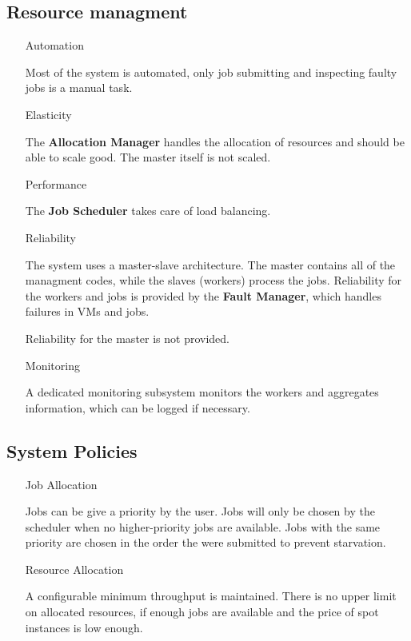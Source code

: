 \documentclass[10pt]{article}
\begin{document}
\subsection*{Resource managment}

\begin{itemize}
\item[Automation]

Most of the system is automated, only job submitting and inspecting faulty jobs is a manual task.

\item[Elasticity]

The \textbf{Allocation Manager} handles the allocation of resources and should be able to scale good. The master itself is not scaled.

\item[Performance]

The \textbf{Job Scheduler} takes care of load balancing.

\item[Reliability]

The system uses a master-slave architecture. The master contains all of the managment codes, while the slaves (workers) process the jobs. Reliability for the workers and jobs is provided by the \textbf{Fault Manager}, which handles failures in VMs and jobs.

Reliability for the master is not provided.

\item[Monitoring]

A dedicated monitoring subsystem monitors the workers and aggregates information, which can be logged if necessary.

\end{itemize}

\subsection*{System Policies}

\begin{itemize}

\item[Job Allocation]

Jobs can be give a priority by the user. Jobs will only be chosen by the scheduler when no higher-priority jobs are available. Jobs with the same priority are chosen in the order the were submitted to prevent starvation.

\item[Resource Allocation]

A configurable minimum throughput is maintained. There is no upper limit on allocated resources, if enough jobs are available and the price of spot instances is low enough.

\end{itemize}
\end{document}
